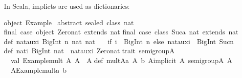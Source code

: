 \begin{isabellebody}
\begin{isamarkuptext}
\begin{typewriter}
  \end{typewriter}%
\end{isamarkuptext}%
\isamarkuptrue%
%
\endisatagquote
{\isafoldquote}%
%
\isadelimquote
%
\endisadelimquote
%
\begin{isamarkuptext}%
\noindent In Scala, implicts are used as dictionaries:%
\end{isamarkuptext}%
\isamarkuptrue%
%
\isadeliminvisible
%
\endisadeliminvisible
%
\isataginvisible
%
\endisataginvisible
{\isafoldinvisible}%
%
\isadeliminvisible
%
\endisadeliminvisible
%
\isadelimquote
%
\endisadelimquote
%
\isatagquote
%
\begin{isamarkuptext}%
\begin{typewriter}
    object\ Example\ {\isacharbraceleft}\isanewline
\isanewline
abstract\ sealed\ class\ nat\isanewline
final\ case\ object\ Zero{\isacharunderscore}nat\ extends\ nat\isanewline
final\ case\ class\ Suc{\isacharparenleft}a{\isacharcolon}\ nat{\isacharparenright}\ extends\ nat\isanewline
\isanewline
def\ nat{\isacharunderscore}aux{\isacharparenleft}i{\isacharcolon}\ BigInt{\isacharcomma}\ n{\isacharcolon}\ nat{\isacharparenright}{\isacharcolon}\ nat\ {\isacharequal}\isanewline
\ \ {\isacharparenleft}if\ {\isacharparenleft}i\ {\isacharless}{\isacharequal}\ BigInt{\isacharparenleft}{}{\isacharparenright}{\isacharparenright}\ n\ else\ nat{\isacharunderscore}aux{\isacharparenleft}i\ {\isacharminus}\ BigInt{\isacharparenleft}{}{\isacharparenright}{\isacharcomma}\ Suc{\isacharparenleft}n{\isacharparenright}{\isacharparenright}{\isacharparenright}\isanewline
\isanewline
def\ nat{\isacharparenleft}i{\isacharcolon}\ BigInt{\isacharparenright}{\isacharcolon}\ nat\ {\isacharequal}\ nat{\isacharunderscore}aux{\isacharparenleft}i{\isacharcomma}\ Zero{\isacharunderscore}nat{\isacharparenright}\isanewline
\isanewline
trait\ semigroup{\isacharbrackleft}A{\isacharbrackright}\ {\isacharbraceleft}\isanewline
\ \ val\ {\isacharbackquote}Example{\isachardot}mult{\isacharbackquote}{\isacharcolon}\ {\isacharparenleft}A{\isacharcomma}\ A{\isacharparenright}\ {\isacharequal}{\isachargreater}\ A\isanewline
{\isacharbraceright}\isanewline
def\ mult{\isacharbrackleft}A{\isacharbrackright}{\isacharparenleft}a{\isacharcolon}\ A{\isacharcomma}\ b{\isacharcolon}\ A{\isacharparenright}{\isacharparenleft}implicit\ A{\isacharcolon}\ semigroup{\isacharbrackleft}A{\isacharbrackright}{\isacharparenright}{\isacharcolon}\ A\ {\isacharequal}\isanewline
\ \ A{\isachardot}{\isacharbackquote}Example{\isachardot}mult{\isacharbackquote}{\isacharparenleft}a{\isacharcomma}\ b{\isacharparenright}\isanewline

\end{typewriter}
\end{isamarkuptext}
\end{isabellebody}
